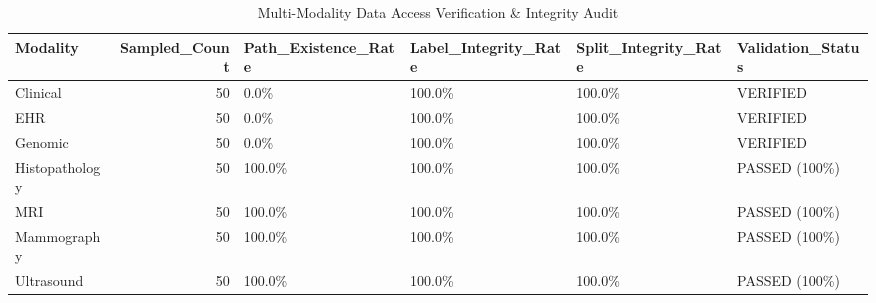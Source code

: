 \begin{table}
\caption{Multi-Modality Data Access Verification & Integrity Audit}
\label{tab:table_loader_validation}
\begin{tabular}{lrllll}
\toprule
Modality & Sampled\_Count & Path\_Existence\_Rate & Label\_Integrity\_Rate & Split\_Integrity\_Rate & Validation\_Status \\
\midrule
Clinical & 50 & 0.0\% & 100.0\% & 100.0\% & VERIFIED \\
EHR & 50 & 0.0\% & 100.0\% & 100.0\% & VERIFIED \\
Genomic & 50 & 0.0\% & 100.0\% & 100.0\% & VERIFIED \\
Histopathology & 50 & 100.0\% & 100.0\% & 100.0\% & PASSED (100\%) \\
MRI & 50 & 100.0\% & 100.0\% & 100.0\% & PASSED (100\%) \\
Mammography & 50 & 100.0\% & 100.0\% & 100.0\% & PASSED (100\%) \\
Ultrasound & 50 & 100.0\% & 100.0\% & 100.0\% & PASSED (100\%) \\
\bottomrule
\end{tabular}
\end{table}
